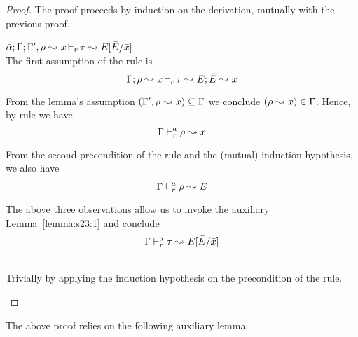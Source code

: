 \begin{proof}
The proof proceeds by induction on the derivation, mutually 
with the previous proof.
\begin{description}
\setlength{\itemsep}{1em}
\item[\fbox{\texttt{(L-RuleMatch)}}]\quad$\bar{\alpha}; \Gamma; \Gamma', \rho \leadsto x \mathop{\vdash_{r}} \tau \leadsto E[\bar{E}/\bar{x}]$ \ \\
  The first assumption of the rule is
\begin{equation*}
  \Gamma; \rho \leadsto x \mathop{\vdash_{r}} \tau \leadsto E; \bar{E} \leadsto \bar{x}
\end{equation*}

  From the lemma's assumption $(\Gamma', \rho \leadsto x) \subseteq \Gamma$ we conclude
  $(\rho \leadsto x) \in \Gamma$. Hence, by rule  we have
\begin{equation*}
  \Gamma \vdash^a_{r} \rho \leadsto x
\end{equation*}

  From the second precondition of the rule and the (mutual) induction hypothesis, we also have
\begin{equation*}
  \Gamma \vdash^a_{r} \bar{\rho} \leadsto \bar{E}
\end{equation*}

  The above three observations allow us to invoke the auxiliary Lemma~\ref{lemma:s23:1}
  and conclude
\begin{equation*}
  \Gamma \vdash^a_{r} \tau \leadsto E[\bar{E}/\bar{x}]
\end{equation*}

\item[\fbox{\texttt{(L-Var), (L-TyVar), (L-RuleNoMatch)}}] \ \\
  Trivially by applying the induction hypothesis on the precondition of the rule.
\end{description}
\end{proof}

The above proof relies on the following auxiliary lemma.

